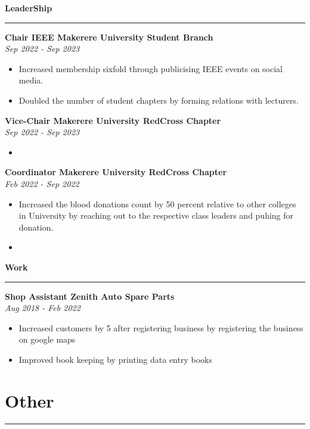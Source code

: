 \documentclass[a4paper]{article}
\begin{document}
    \hfil
    \begin{minipage}[t]{0.5\textwidth}
        {\Large\bf LeaderShip}
        \hrule
        {\bf Chair IEEE Makerere University Student Branch}\\
        \hfil{\em Sep 2022 - Sep 2023}\\
        \begin{itemize}
            \item Increased membership sixfold through publicising IEEE events on social media.
            \item Doubled the number of student chapters by forming relations with lecturers.
        \end{itemize}


        {\bf Vice-Chair Makerere University RedCross Chapter}\\
        \hfil{\em Sep 2022 - Sep 2023}\\
        \begin{itemize}
            \item
        \end{itemize}

        {\bf Coordinator Makerere University RedCross Chapter}\\
        \hfil{\em Feb 2022 - Sep 2022}\\
        \begin{itemize}
            \item Increased the blood donations count by 50 percent relative to other colleges in University by reaching out to the respective class leaders and puhing for donation.
            \item
        \end{itemize}

        {\Large\bf Work}
        \hrule
        {\bf Shop Assistant Zenith Auto Spare Parts}\\
        \hfil{\em Aug 2018 - Feb 2022}
        \begin{itemize}
            \item Increased customers by 5 after registering business by registering the business on google maps
            \item Improved book keeping by printing data entry books
        \end{itemize}

        \section*{Other}
        \hrule

    \end{minipage}
\end{document}
